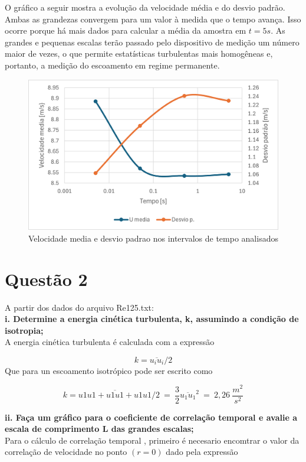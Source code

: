 \documentclass[12pt]{article}
\begin{document}
O gráfico a seguir mostra a evolução da velocidade média e do desvio padrão. Ambas as grandezas convergem para um valor à medida que o tempo avança. Isso ocorre porque há mais dados para calcular a média da amostra em $t=5s$. As grandes e pequenas escalas terão passado pelo dispositivo de medição um número maior de vezes, o que permite estatísticas turbulentas mais homogêneas e, portanto, a medição do escoamento em regime permanente.

\begin{figure}[H]
	\centering
	\includegraphics[width=.65\textwidth]{figures/2}
	\caption{Velocidade media e desvio padrao nos intervalos de tempo analisados}
\end{figure}


\section*{Questão 2}

A partir dos dados do arquivo Re125.txt:\\
\textbf{i. Determine a energia cinética turbulenta, k, assumindo a condição de isotropia;}\\

A energia cinética turbulenta é calculada com a expressão


\begin{equation}
	k = {\overline{u_i u_i}}/2
\end{equation}
Que para un escoamento isotrópico pode ser escrito como 

\begin{equation}
	k = {\overline{u1u1 + u1u1 + u1u1}}/2 \ = \ \frac{3}{2}\overline{u_1 u_1}^2 \ = \ 2,26 \ \frac{m^2}{s^2}
\end{equation}

\textbf{ii. Faça um gráfico para o coeficiente de correlação temporal e avalie a escala de
comprimento L das grandes escalas;}\\

Para o cálculo de correlação temporal , primeiro é necesario encomtrar o valor da correlação de velocidade no ponto $(r=0)$ dado pela expressão
\end{document}
